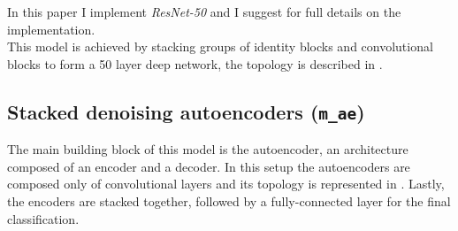 In this paper I implement {\it ResNet-50} and I suggest \cite{resnets-2015} for full details on the implementation.\\
This model is achieved by stacking groups of identity blocks and convolutional blocks to form a 50 layer deep network, the topology is described in .

\begin{table*}[]
\captionsetup{font=scriptsize, justification=centering}
\centering
{}
\caption{\texttt{m_resnet} model representation. \texttt{BN} stands for batch normalization, \texttt{MP} for max pooling, \texttt{S1-S4} represent the 4 stages of the identity-convolutional blocks, the first block of every stage is convolutional, the rest are identity blocks. \texttt{AP} stands for average pooling, pooling is done only along the temporal dimension.}
\label{m_resnet_table}
\end{table*}

\subsection{Stacked denoising autoencoders (\texttt{m_ae})}
\label{sec:m_ae}
The main building block of this model is the autoencoder, an architecture composed of an encoder and a decoder. In this setup the autoencoders are composed only of convolutional layers and its topology is represented in . Lastly, the encoders are stacked together, followed by a \mbox{fully-connected} layer for the final classification.\\

